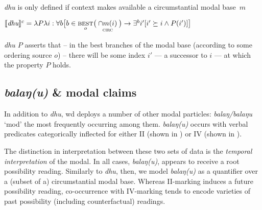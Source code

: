 \textit{dhu} is only defined if context makes available a circumstantial modal base~$ m $

$ \denote[c]{\textit{dhu}}=\lambda P\lambda i:\forall b\big[b\in\underset{o}{\textsc{best}}\big(\underset{\textsc{circ}}{\cap m(i)}\big)\to\exists^b i'[i'\succeq i\wedge P(i')]\big] $

\textit{dhu $ P $} %
 asserts that -- in the best branches of the modal base (according to some ordering source $ o $) -- there will be some  index $ i' $ --- a successor to $ i $ --- at which the property $ P $ holds.%
\xe%

\subsection{\textit{balaŋ(u)} \& modal claims}

In addition to \textit{dhu}, \gls{wd} deploys a number of other modal particles: \textit{balaŋ/balaŋu} `\gls{mod}' the most frequently occurring among them. \textit{balaŋ(u)} occurs with verbal predicates categorically inflected for either \gls{II} (shown in ) or \gls{IV} (shown in ).

The distinction in interpretation between these two sets of data is the \textit{temporal interpretation} of the modal. In all cases, \textit{balaŋ(u)}, appears to receive a root possibility reading. Similarly to \textit{dhu}, then, we model \textit{balaŋ(u)} as a quantifier over a (subset of a) circumstantial modal base. Whereas \gls{II}-marking induces a future possibility reading, co-occurrence with \gls{IV}-marking tends to encode varieties of past possibility (including counterfactual) readings.

